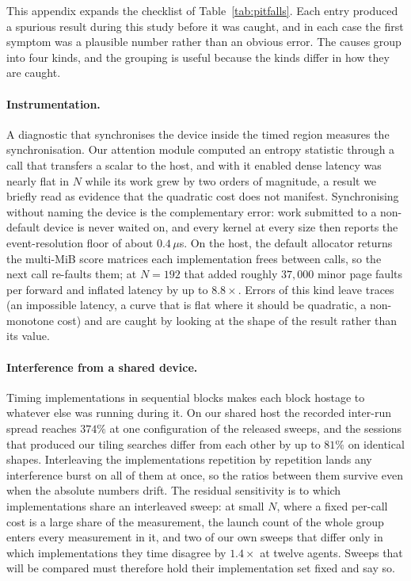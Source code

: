 This appendix expands the checklist of Table~\ref{tab:pitfalls}. Each entry
produced a spurious result during this study before it was caught, and in each
case the first symptom was a plausible number rather than an obvious error. The
causes group into four kinds, and the grouping is useful because the kinds
differ in how they are caught.

\paragraph{Instrumentation.} A diagnostic that synchronises the device inside
the timed region measures the synchronisation. Our attention module computed an
entropy statistic through a call that transfers a scalar to the host, and with
it enabled dense latency was nearly flat in $N$ while its work grew by two
orders of magnitude, a result we briefly read as evidence that the quadratic
cost does not manifest. Synchronising without naming the device is the
complementary error: work submitted to a non-default device is never waited on,
and every kernel at every size then reports the event-resolution floor of about
$0.4\,\mu$s. On the host, the default allocator returns the multi-MiB score
matrices each implementation frees between calls, so the next call re-faults
them; at $N{=}192$ that added roughly $37{,}000$ minor page faults per forward
and inflated latency by up to $8.8\times$. Errors of this kind leave traces (an impossible latency, a curve that is flat
where it should be quadratic, a non-monotone cost) and are caught by looking at the shape of the result
rather
than its value.

\paragraph{Interference from a shared device.} Timing implementations in
sequential blocks makes each block hostage to whatever else was running during
it. On our shared host the recorded inter-run spread reaches $374\%$ at one
configuration of the released sweeps, and the sessions that produced our tiling
searches differ from each other by up to $81\%$ on identical shapes. Interleaving the implementations repetition by repetition lands any
interference burst on all of them at once, so the ratios between them survive
even when the absolute numbers drift. The residual sensitivity is to which
implementations share an interleaved sweep: at small $N$, where a fixed per-call cost is a large share of the
measurement, the launch count of the whole group enters every measurement in it,
and two of our own sweeps that differ only in which implementations they time
disagree by $1.4\times$ at twelve agents. Sweeps that will be compared
must therefore hold their implementation set fixed and say so.

